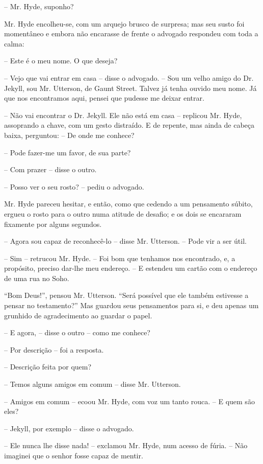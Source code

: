 -- Mr. Hyde, suponho?

Mr. Hyde encolheu-se, com um arquejo brusco de surpresa; mas seu susto
foi momentâneo e embora não encarasse de frente o advogado respondeu
com toda a calma:

-- Este é o meu nome.  O que deseja?

-- Vejo que vai entrar em casa -- disse o advogado. -- Sou um velho amigo
do Dr. Jekyll, sou Mr. Utterson, de Gaunt Street.  Talvez já tenha
ouvido meu nome.  Já que nos encontramos aqui, pensei que pudesse me
deixar entrar.

-- Não vai encontrar o Dr. Jekyll.  Ele não está em casa -- replicou Mr.
Hyde, assoprando a chave, com um gesto distraído. E de repente, mas
ainda de cabeça baixa, perguntou: -- De onde me conhece? 

-- Pode fazer-me um favor, de sua parte? 

-- Com prazer -- disse o outro.  

-- Posso ver o seu rosto? -- pediu o advogado.

Mr. Hyde pareceu hesitar, e então, como que cedendo a um pensamento
súbito, ergueu o rosto para o outro numa atitude de desafio; e os dois
se encararam fixamente por alguns segundos.

-- Agora sou capaz de reconhecê-lo -- disse Mr. Utterson. -- Pode vir a
ser útil. 

-- Sim -- retrucou Mr. Hyde. -- Foi bom que tenhamos nos encontrado, e, a
propósito, preciso dar-lhe meu endereço. -- E estendeu um cartão com o
endereço de uma rua no Soho.

“Bom Deus!”, pensou Mr. Utterson. “Será possível que ele também
estivesse a pensar no testamento?”  Mas guardou seus pensamentos para
si, e deu apenas um grunhido de agradecimento ao guardar o papel.

-- E agora, -- disse o outro -- como me conhece?

-- Por descrição -- foi a resposta.

-- Descrição feita por quem?

-- Temos alguns amigos em comum -- disse Mr. Utterson.

-- Amigos em comum -- ecoou Mr. Hyde, com voz um tanto rouca. -- E quem
são eles?

-- Jekyll, por exemplo -- disse o advogado.

-- Ele nunca lhe disse nada! -- exclamou Mr. Hyde, num acesso de fúria.
-- Não imaginei que o senhor fosse capaz de mentir.

